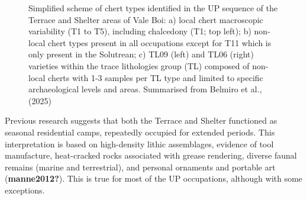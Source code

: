 \documentclass[
  a4paper,
  DIV=11,
  numbers=noendperiod]{scrreprt}
\begin{document}
\begin{figure}


\caption{\label{fig-cherts}Simplified scheme of chert types identified
in the UP sequence of the Terrace and Shelter areas of Vale Boi: a)
local chert macroscopic variability (T1 to T5), including chalcedony
(T1; top left); b) non-local chert types present in all occupations
except for T11 which is only present in the Solutrean; c) TL09 (left)
and TL06 (right) varieties within the trace lithologies group (TL)
composed of non-local cherts with 1-3 samples per TL type and limited to
specific archaeological levels and areas. Summarised from Belmiro et
al., (2025)}

\end{figure}%

Previous research suggests that both the Terrace and Shelter functioned
as seasonal residential camps, repeatedly occupied for extended periods.
This interpretation is based on high-density lithic assemblages,
evidence of tool manufacture, heat-cracked rocks associated with grease
rendering, diverse faunal remains (marine and terrestrial), and personal
ornaments and portable art (\textbf{manne2012?}). This is true for most
of the UP occupations, although with some exceptions.
\end{document}
